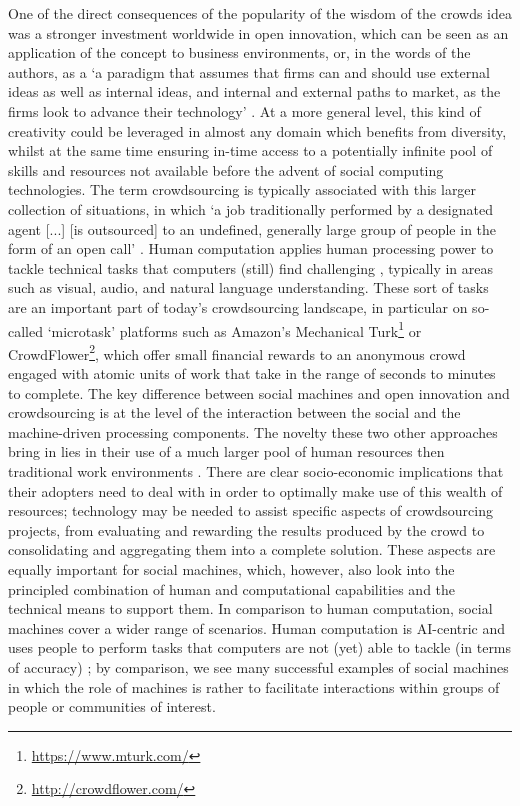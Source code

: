 \documentclass{www13-companion-accepted}
\begin{document}
One of the direct consequences of the popularity of the wisdom of the crowds idea was a stronger investment worldwide in open innovation, which can be seen as an application of the concept to business environments, or, in the words of the authors, as a `a paradigm that assumes that firms can and should use external ideas as well as internal ideas, and internal and external paths to market, as the firms look to advance their technology' \cite{chesbrough2003}. At a more general level, this kind of creativity could be leveraged in almost any domain which benefits from diversity, whilst at the same time ensuring in-time access to a potentially infinite pool of skills and resources not available before the advent of social computing technologies. The term crowdsourcing is typically associated with this larger collection of situations, in which `a job traditionally performed by a designated agent [...] [is outsourced] to an undefined, generally large group of people in the form of an open call' \cite{howe2006crowdsourcing}. Human computation applies human processing power to tackle technical tasks that computers (still) find challenging \cite{von2009human}, typically in areas such as visual, audio, and natural language understanding. These sort of tasks are an important part of today's crowdsourcing landscape, in particular on so-called `microtask' platforms such as Amazon's Mechanical Turk\footnote{\url{https://www.mturk.com/}} or CrowdFlower\footnote{\url{http://crowdflower.com/}}, which offer small financial rewards to an anonymous crowd engaged with atomic units of work that take in the range of seconds to minutes to complete. The key difference between social machines and open innovation and crowdsourcing is at the level of the interaction between the social and the machine-driven processing components. The novelty these two other approaches bring in lies in their use of a much larger pool of human resources then traditional work environments \cite{quinn2011human}. There are clear socio-economic implications that their adopters need to deal with in order to optimally make use of this wealth of resources; technology may be needed to assist specific aspects of crowdsourcing projects, from evaluating and rewarding the results produced by the crowd to consolidating and aggregating them into a complete solution. These aspects are equally important for social machines, which, however, also look into the principled combination of human and computational capabilities and the technical means to support them. In comparison to human computation, social machines cover a wider range of scenarios. Human computation is AI-centric and uses people to perform tasks that computers are not (yet) able to tackle (in terms of accuracy) \cite{quinn2011human}; by comparison, we see many successful examples of social machines in which the role of machines is rather to facilitate interactions within groups of people or communities of interest.
\end{document}
